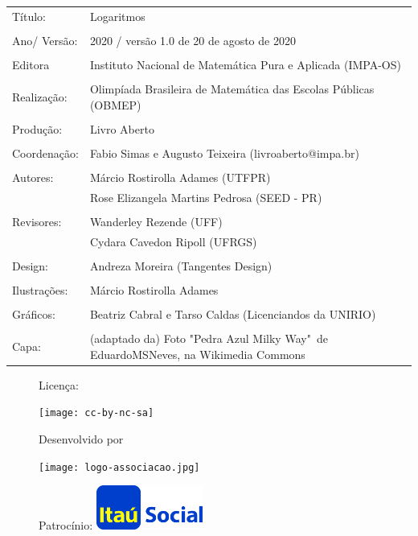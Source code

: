 \begin{tabular}{p{}p{}}
Título: & Logaritmos\\
\\
Ano/ Versão: & 2020 / versão 1.0 de 20 de agosto de 2020\\
\\
Editora & Instituto Nacional de Matem\'atica Pura e Aplicada (IMPA-OS)\\
\\
Realização:& Olimp\'iada Brasileira de Matem\'atica das Escolas P\'ublicas (OBMEP)\\
\\
Produção:& Livro Aberto\\
\\
Coordenação:& Fabio Simas e Augusto Teixeira (livroaberto@impa.br)\\
\\
  Autores: & Márcio Rostirolla Adames (UTFPR)\\
             & Rose Elizangela Martins Pedrosa (SEED - PR)\\
\\
Revisores: & Wanderley Rezende (UFF) \\ & Cydara Cavedon Ripoll (UFRGS) \\
                
\\
Design: & Andreza Moreira (Tangentes Design)\\
\\
  Ilustrações: & Márcio Rostirolla Adames \\ 
\\
Gráficos: & Beatriz Cabral e Tarso Caldas (Licenciandos da UNIRIO)\\
\\
Capa: & (adaptado da) Foto "Pedra Azul Milky Way"\, de EduardoMSNeves, na Wikimedia Commons  \\

\end{tabular}
\vspace{.5cm}



\begin{figure}[b]
\begin{minipage}[l]{5cm}
\centering

{\large Licença:}

  \texttt{[image: cc-by-nc-sa]}
\end{minipage}\hfill
\begin{minipage}[c]{5cm}
\centering
{\large Desenvolvido por}

\texttt{[image: logo-associacao.jpg]}
\end{minipage}
\begin{minipage}[r]{5cm}
\centering

{\large Patrocínio:}
  \vspace{1em}
  \includegraphics[width=3.5cm]{itau}
\end{minipage}
\end{figure}


